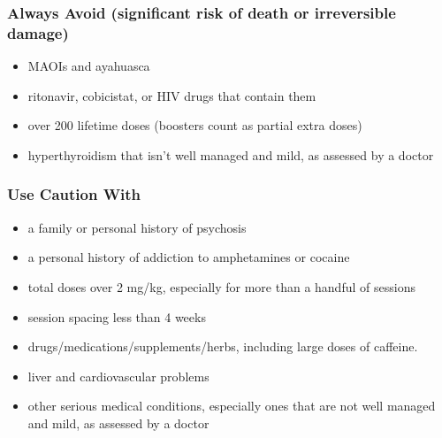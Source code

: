 \documentclass[11pt,oneside]{book}
\let\cite\parencite
\begin{document}
\subsubsection*{Always Avoid (significant risk of death or irreversible damage)}
\begin{itemize}
    \item MAOIs and ayahuasca
    \item ritonavir, cobicistat, or HIV drugs that contain them
    \item over 200 lifetime doses (boosters count as partial extra doses)
    \item hyperthyroidism that isn't well managed and mild, as assessed by a doctor~\cite{mitchellMDMAClinicalTrial2}
\end{itemize}

\subsubsection*{Use Caution With}
\begin{itemize}
    \item a family or personal history of psychosis
    \item a personal history of addiction to amphetamines or cocaine
    \item total doses over 2 mg/kg, especially for more than a handful of sessions
    \item session spacing less than 4 weeks
    \item drugs/medications/supplements/herbs, including large doses of caffeine. 
    \item liver and cardiovascular problems
    \item other serious medical conditions, especially ones that are not well managed and mild, as assessed by a doctor~\cite{mitchellMDMAClinicalTrial2}
\end{itemize}
\end{document}
